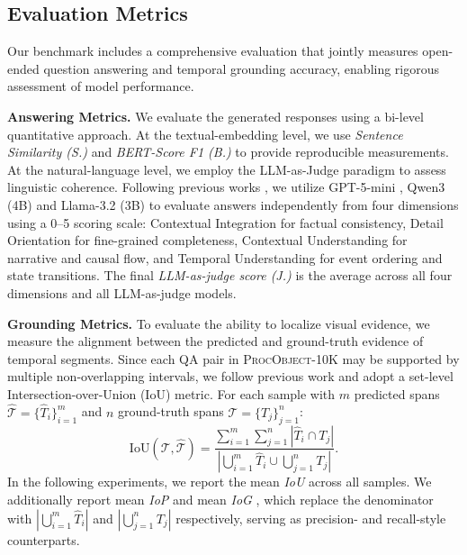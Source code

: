 \subsection{Evaluation Metrics}
\label{sec:eval_metrics}

Our benchmark includes a comprehensive evaluation that jointly measures open-ended question answering and temporal grounding accuracy, enabling rigorous assessment of model performance.

\textbf{Answering Metrics.} We evaluate the generated responses using a bi-level quantitative approach. At the textual-embedding level, we use \textit{Sentence Similarity (S.)} \cite{reimers2019sentence} and \textit{BERT-Score F1 (B.)} \cite{zhang2019bertscore} to provide reproducible measurements. At the natural-language level, we employ the LLM-as-Judge paradigm to assess linguistic coherence. Following previous works \cite{liu2025surveillancevqa, maaz2024videogpt+}, we utilize GPT-5-mini \cite{openai_gpt5_2025}, Qwen3 (4B) \cite{yang2025qwen3} and Llama-3.2 (3B) \cite{dubey2024llama} to evaluate answers independently from four dimensions using a 0–5 scoring scale: Contextual Integration for factual consistency, Detail Orientation for fine-grained completeness, Contextual Understanding for narrative and causal flow, and Temporal Understanding for event ordering and state transitions. The final \textit{LLM-as-judge score (J.)} is the average across all four dimensions and all LLM-as-judge models.

\textbf{Grounding Metrics.} To evaluate the ability to localize visual evidence, we measure the alignment between the predicted and ground-truth evidence of temporal segments. Since each QA pair in \textsc{ProcObject-10K} may be supported by multiple non-overlapping intervals, we follow previous work \cite{chen2025grounded} and adopt a set-level Intersection-over-Union (IoU) metric. For each sample with $m$ predicted spans $\hat{\mathcal{T}} = \{\hat{T}_i\}_{i=1}^{m}$ and $n$ ground-truth spans $\mathcal{T} = \{T_j\}_{j=1}^{n}$:
\begin{equation}
    \text{IoU}(\mathcal{T}, \hat{\mathcal{T}}) = \frac{\sum_{i=1}^{m}\sum_{j=1}^{n} |\hat{T}_i \cap T_j|}{\left| \bigcup_{i=1}^{m} \hat{T}_i \cup \bigcup_{j=1}^{n} T_j \right|}.
\end{equation}
In the following experiments, we report the mean \textit{IoU} across all samples. We additionally report mean \textit{IoP} and mean \textit{IoG} \cite{chen2025grounded}, which replace the denominator with $\left|\bigcup_{i=1}^{m} \hat{T}_i\right|$ and $\left|\bigcup_{j=1}^{n} T_j\right|$ respectively, serving as precision- and recall-style counterparts.

